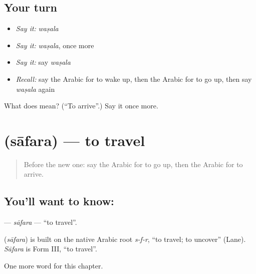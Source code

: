 \subsection*{Your turn}
\begin{itemize}
\raggedright
  \item \emph{Say it:} \emph{waṣala}
  \item \emph{Say it:} \emph{waṣala}, once more
  \item \emph{Say it:} say \emph{waṣala}
  \item \emph{Recall:} say the Arabic for to wake up, then the Arabic for to go up, then say \emph{waṣala} again
\end{itemize}

\begin{tcolorbox}[breakable,colback=teal!4,colframe=teal!35!black,title={Before you move on}]
What does  mean? (\textquotedblleft{}To arrive\textquotedblright{}.) Say it once more.
\end{tcolorbox}
\section[\texorpdfstring{\ar{سافر} (sāfara)}{سافر (sāfara)}]{ (sāfara) — to travel}

\label{lesson:AR-C159-safara}



\begin{quote}
Before the new one: say the Arabic for to go up, then the Arabic for to arrive.
\end{quote}

\subsection*{You'll want to know: }
\textbf{} — \emph{sāfara} — \textquotedblleft{}to travel\textquotedblright{}.

\begin{cousinweb}
\textbf{} (\emph{sāfara}) is built on the native Arabic root \emph{s-f-r}, \textquotedblleft{}to travel; to uncover\textquotedblright{} (Lane). \emph{Sāfara} is Form III, \textquotedblleft{}to travel\textquotedblright{}.
\end{cousinweb}

\begin{grammarlens}[title={What you've built}]
One more word for this chapter.
\end{grammarlens}

